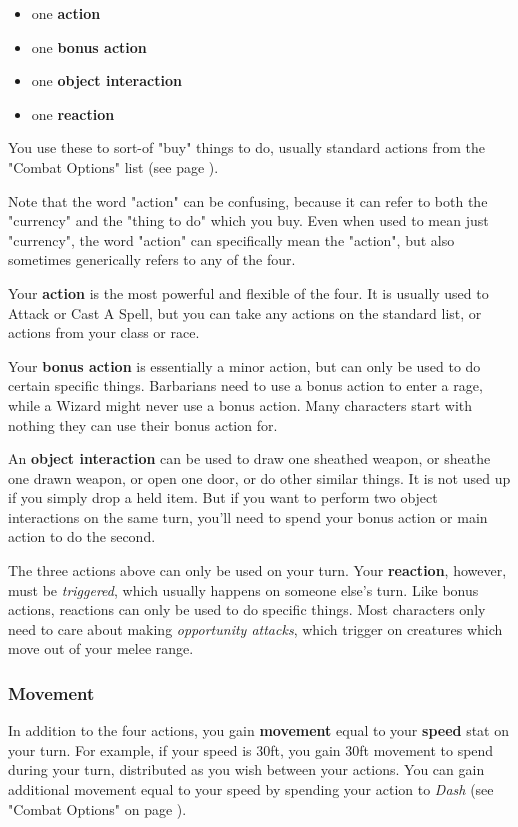 \documentclass[letterpaper,twocolumn,openany,nodeprecatedcode,bg=print]{dndbook}
\newcommand{\pg}[1]{page \pageref{#1}}
\newcommand{\see}[1]{(see \pg{#1})}
\begin{document}
\begin{itemize}
\item one \textbf{action}
\item one \textbf{bonus action}
\item one \textbf{object interaction}
\item one \textbf{reaction}
\end{itemize}

You use these to sort-of "buy" things to do, usually standard actions from the "Combat Options" list \see{combat-options}.

Note that the word "action" can be confusing, because it can refer to both the "currency" and the "thing to do" which you buy. Even when used to mean just "currency", the word "action" can specifically mean the "action", but also sometimes generically refers to any of the four.

Your \textbf{action} is the most powerful and flexible of the four. 
It is usually used to Attack or Cast A Spell, but you can take any actions on the standard list, 
or actions from your class or race.

Your \textbf{bonus action} is essentially a minor action, but can only be used to do certain specific things. 
Barbarians need to use a bonus action to enter a rage, while a Wizard might never use a bonus action. 
Many characters start with nothing they can use their bonus action for.

An \textbf{object interaction} can be used to 
draw one sheathed weapon, 
or sheathe one drawn weapon, 
or open one door, 
or do other similar things. 
It is not used up if you simply drop a held item. But if you want to perform two object interactions on the same turn, you'll need to spend your bonus action or main action to do the second.

The three actions above can only be used on your turn. 
Your \textbf{reaction}, however, must be \textit{triggered}, which usually happens on someone else's turn. 
Like bonus actions, reactions can only be used to do specific things. 
Most characters only need to care about making \textit{opportunity attacks}, which trigger on creatures which move out of your melee range.

\subsubsection{Movement}

In addition to the four actions, you gain \textbf{movement} equal to your \textbf{speed} stat on your turn. 
For example, if your speed is 30ft, you gain 30ft movement to spend during your turn, distributed as you wish between your actions. You can gain additional movement equal to your speed by spending your action to \textit{Dash} (see "Combat Options" on \pg{combat-options}).
\end{document}
